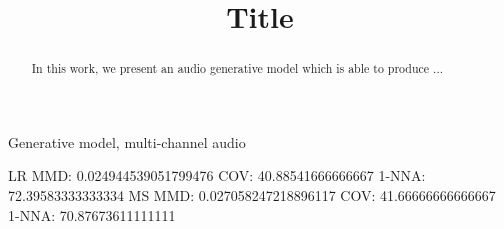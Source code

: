 \documentclass{article}
\title{Title}
\begin{document}
\maketitle

\begin{abstract}
In this work, we present an audio generative model which is able to produce ... 
\end{abstract}

\begin{keywords}
Generative model, multi-channel audio
\end{keywords}





LR 
MMD: 0.024944539051799476
COV: 40.88541666666667
1-NNA: 72.39583333333334
MS
MMD: 0.027058247218896117
COV: 41.66666666666667
1-NNA: 70.87673611111111
\fi




\end{document}
